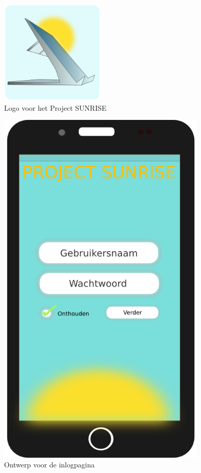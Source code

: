\begin{figure}[htbp]
\centering
\includegraphics[width=5cm]{images/logo.png}
\caption{Logo voor het Project SUNRISE}\label{fig:logo}
\end{figure}

\begin{figure}[htbp]
\centering
\includegraphics[width=10cm]{images/main.png}
\caption{Ontwerp voor de inlogpagina}\label{fig:main}
\end{figure}

